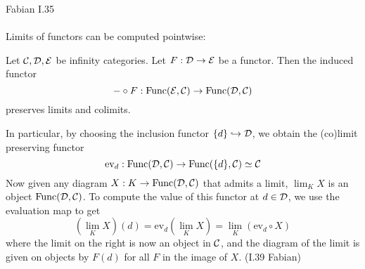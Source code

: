 \documentclass[a4paper]{article}
\begin{document}
Fabian I.35\\~\\

Limits of functors can be computed pointwise: 

\begin{prp}{}{} Let $\mathcal{C},\mathcal{D},\mathcal{E}$ be infinity categories. Let $F:\mathcal{D}\to\mathcal{E}$ be a functor. Then the induced functor $$-\circ F:\text{Func}(\mathcal{E},\mathcal{C})\to\text{Func}(\mathcal{D},\mathcal{C})$$ preserves limits and colimits. 
\end{prp}

In particular, by choosing the inclusion functor $\{d\}\hookrightarrow\mathcal{D}$, we obtain the (co)limit preserving functor $$\text{ev}_d:\text{Func}(\mathcal{D},\mathcal{C})\to\text{Func}(\{d\},\mathcal{C})\simeq\mathcal{C}$$ Now given any diagram $X:K\to\text{Func}(\mathcal{D},\mathcal{C})$ that admits a limit, $\lim_K X$ is an object $\text{Func}(\mathcal{D},\mathcal{C})$. To compute the value of this functor at $d\in\mathcal{D}$, we use the evaluation map to get $$\left(\lim_K X\right)(d)=\text{ev}_d\left(\lim_KX\right)=\lim_K(\text{ev}_d\circ X)$$ where the limit on the right is now an object in $\mathcal{C}$, and the diagram of the limit is given on objects by $F(d)$ for all $F$ in the image of $X$. (I.39 Fabian)
\end{document}
